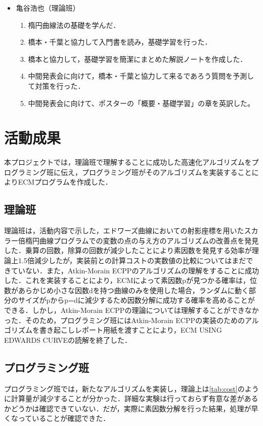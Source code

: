 \documentclass[openany,11pt,papersize]{jsbook}
\begin{document}
\begin{itemize}
\item 亀谷浩也（理論班）
 \begin{enumerate}
 \renewcommand{\labelenumi}{(\arabic{enumi})}
 \item 楕円曲線法の基礎を学んだ．
 \item 橋本・千葉と協力して入門書を読み，基礎学習を行った．
 \item 橋本と協力して，基礎学習を簡潔にまとめた解説ノートを作成した．
 \item 中間発表会に向けて，橋本・千葉と協力して来るであろう質問を予測して対策を行った．
 \item 中間発表会に向けて、ポスターの「概要・基礎学習」の章を英訳した。
 \end{enumerate}
 
\end{itemize}


\chapter{活動成果}

本プロジェクトでは，理論班で理解することに成功した高速化アルゴリズムをプログラミング班に伝え，プログラミング班がそのアルゴリズムを実装することによりECMプログラムを作成した．


\section{理論班}

理論班は，活動内容で示した，エドワーズ曲線においての射影座標を用いたスカラー倍楕円曲線プログラムでの変数の点の与え方のアルゴリズムの改善点を発見した．乗算の回数，除算の回数が減少したことにより素因数を発見する効率が理論上1.5倍減少したが，実装前との計算コストの実数値の比較についてはまだできていない．また，Atkin-Morain ECPPのアルゴリズムの理解をすることに成功した．これを実装することにより，ECMによって素因数pが見つかる確率は，位数があらかじめ小さな因数dを持つ曲線のみを使用した場合，ランダムに動く部分のサイズがpからp=dに減少するため因数分解に成功する確率を高めることができる．しかし，Atkin-Morain ECPPの理論については理解することができなかった．そのため，プログラミング班にはAtkin-Morain ECPPの実装のためのアルゴリズムを書き起こしレポート用紙を渡すことにより，ECM USING EDWARDS CURVEの読解を終了した．


\section{プログラミング班}
プログラミング班では，新たなアルゴリズムを実装し，理論上は\ref{tab:cost}のように計算量が減少することが分かった．詳細な実験は行っておらず有意な差があるかどうかは確認できていない．だが，実際に素因数分解を行った結果，処理が早くなっていることが確認できた．
\end{document}
